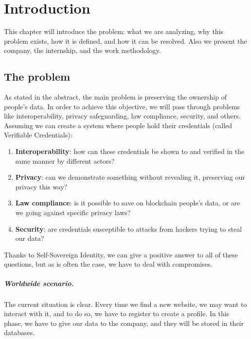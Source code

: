 
\chapter{Introduction}
This chapter will introduce the problem: what we are analyzing, why 
this problem exists, how it is defined, and how it can be resolved. 
Also we present the company, the internship, and the work 
methodology.
\section{The problem}
As stated in the abstract, the main problem is preserving the ownership 
of people's data. In order to achieve this objective, we will pass through 
problems like interoperability, privacy safeguarding, law compliance, security,
and others.
\vspace*{0.3cm}\\
Assuming we can create a system where people hold their credentials 
(called Verifiable Credentials):
\begin{enumerate}
    \setlength\itemsep{-0.3em}
    \item \textbf{Interoperability}: how can these credentials be shown to and 
    verified in the same manner by different actors?
    \item \textbf{Privacy}: can we demonstrate something without revealing it, 
    preserving our privacy this way?
    \item \textbf{Law compliance}: is it possible to save on blockchain people's
    data, or are we going against specific privacy laws?
    \item \textbf{Security}: are credentials susceptible to attacks from hackers 
    trying to steal our data?
\end{enumerate}
Thanks to Self-Sovereign Identity, we can give a positive answer to all
of these questions, but as is often the case, we have to deal with 
compromises.

\paragraph{Worldwide scenario.} The current situation is clear. Every time we 
find a new website, we may want to interact with it, and to do so, we 
have to register to create a profile. In this phase, we have to give our data to 
the company, and they will be stored in their databases.

